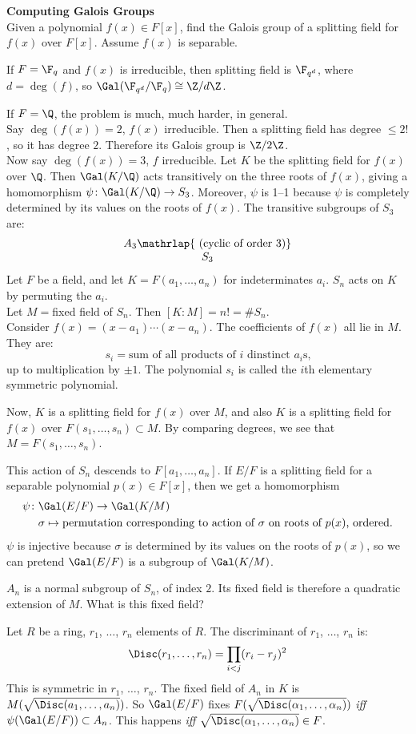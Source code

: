 \textbf{Computing Galois Groups} \\
Given a polynomial $f(x)\in F[x]$, find the Galois group of a splitting field for $f(x)$ over $F[x]$.  Assume $f(x)$ is separable.

If $F=\F_q$ and $f(x)$ is irreducible, then splitting field is $\F_{q^d}$, where $d=\deg(f)$, so $\Gal(\F_{q^d}/\F_q)\cong\Z/d\Z$.

If $F=\Q$, the problem is much, much harder, in general. \\
Say $\deg(f(x))=2$, $f(x)$ irreducible.  Then a splitting field has degree $\leq2!$, so it has degree $2$.  Therefore its Galois group is $\Z/2\Z$. \\
Now say $\deg(f(x))=3$, $f$ irreducible.  Let $K$ be the splitting field for $f(x)$ over $\Q$.  Then $\Gal(K/\Q)$ acts transitively on the three roots of $f(x)$, giving a homomorphism $\psi\colon\Gal(K/\Q)\to S_3$.  Moreover, $\psi$ is 1--1 because $\psi$ is completely determined by its values on the roots of $f(x)$.  The transitive subgroups of $S_3$ are:
\[ \begin{array}{c}
A_3\mathrlap{\text{ (cyclic of order 3)}} \\
S_3
\end{array} \]
Let $F$ be a field, and let $K=F(a_1,\dotsc,a_n)$ for indeterminates $a_i$.  $S_n$ acts on $K$ by permuting the $a_i$. \\
Let $M={}$fixed field of $S_n$.  Then $[K:M]=n!=\#S_n$. \\
Consider $f(x)=(x-a_1)\dotsm(x-a_n)$.  The coefficients of $f(x)$ all lie in $M$.  They are:
\[ s_i=\text{sum of all products of $i$ dinstinct $a_i$s,} \]
up to multiplication by $\pm1$.  The polynomial $s_i$ is called the $i$th elementary symmetric polynomial.

Now, $K$ is a splitting field for $f(x)$ over $M$, and also $K$ is a splitting field for $f(x)$ over $F(s_1,\dotsc,s_n)\subset M$.  By comparing degrees, we see that $M=F(s_1,\dotsc,s_n)$.

This action of $S_n$ descends to $F[a_1,\dotsc,a_n]$.  If $E/F$ is a splitting field for a separable polynomial $p(x)\in F[x]$, then we get a homomorphism
\begin{align*}
\psi\colon &\Gal(E/F) \to \Gal(K/M) \\
&\sigma \mapsto \text{permutation corresponding to action of $\sigma$ on roots of $p(x)$, ordered.}
\end{align*}
$\psi$ is injective because $\sigma$ is determined by its values on the roots of $p(x)$, so we can pretend $\Gal(E/F)$ is a subgroup of $\Gal(K/M)$.

$A_n$ is a normal subgroup of $S_n$, of index $2$.  Its fixed field is therefore a quadratic extension of $M$.  What is this fixed field?

 Let $R$ be a ring, $r_1$, $\dotsc$, $r_n$ elements of $R$.  The discriminant of $r_1$, $\dotsc$, $r_n$ is:
\[ \Disc(r_1,\dotsc,r_n) = \prod_{i<j}(r_i-r_j)^2 \]
This is symmetric in $r_1$, $\dotsc$, $r_n$.  The fixed field of $A_n$ in $K$ is $M(\sqrt{\Disc(a_1,\dotsc,a_n)})$.  So $\Gal(E/F)$ fixes $F(\sqrt{\Disc(\alpha_1,\dotsc,\alpha_n)})$ \emph{iff} $\psi(\Gal(E/F))\subset A_n$.  This happens \emph{iff} $\sqrt{\Disc(\alpha_1,\dotsc,\alpha_n)}\in F$.
